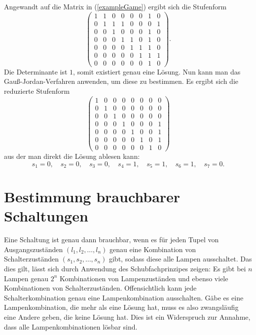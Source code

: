 \documentclass{scrartcl}
\begin{document}
Angewandt auf die Matrix in (\ref{exampleGame}) ergibt sich die Stufenform
\begin{equation}
\left(\begin{array}{ccccccc|c}
  1&1&0&0&0&0&1&0\\
  0&1&1&1&0&0&0&1\\
  0&0&1&0&0&0&1&0\\
  0&0&0&1&1&0&1&0\\
  0&0&0&0&1&1&1&0\\
  0&0&0&0&0&1&1&1\\
  0&0&0&0&0&0&1&0
\end{array}\right).
\end{equation}
Die Determinante ist $1$, somit existiert genau eine Lösung. Nun kann man das
Gauß-Jordan-Verfahren anwenden, um diese zu bestimmen. Es ergibt sich die
reduzierte Stufenform
\begin{equation}
\left(\begin{array}{ccccccc|c}
  1&0&0&0&0&0&0&0\\
  0&1&0&0&0&0&0&0\\
  0&0&1&0&0&0&0&0\\
  0&0&0&1&0&0&0&1\\
  0&0&0&0&1&0&0&1\\
  0&0&0&0&0&1&0&1\\
  0&0&0&0&0&0&1&0
\end{array}\right)
\end{equation}
aus der man direkt die Lösung ablesen kann:
\begin{equation}
s_1 = 0,\quad
s_2 = 0,\quad
s_3 = 0,\quad
s_4 = 1,\quad
s_5 = 1,\quad
s_6 = 1,\quad
s_7 = 0.
\end{equation}

\section{Bestimmung brauchbarer Schaltungen}
Eine Schaltung ist genau dann brauchbar, wenn es für jeden Tupel von
Ausgangszuständen $(l_1,l_2,\dots,l_n)$ genau eine Kombination von
Schalterzuständen $(s_1,s_2,\dots,s_n)$ gibt, sodass diese alle Lampen
ausschaltet. Das dies gilt, lässt sich durch Anwendung des Schubfachprinzipes
zeigen: Es gibt bei $n$ Lampen genau $2^n$ Kombinationen von Lampenzuständen und
ebenso viele Kombinationen von Schalterzuständen. Offensichtlich kann jede
Schalterkombination genau eine Lampenkombination ausschalten. Gäbe es eine
Lampenkombination, die mehr als eine Lösung hat, muss es also zwangsläufig eine
Andere geben, die keine Lösung hat. Dies ist ein Widerspruch zur Annahme, dass
alle Lampenkombinationen lösbar sind.
\end{document}
